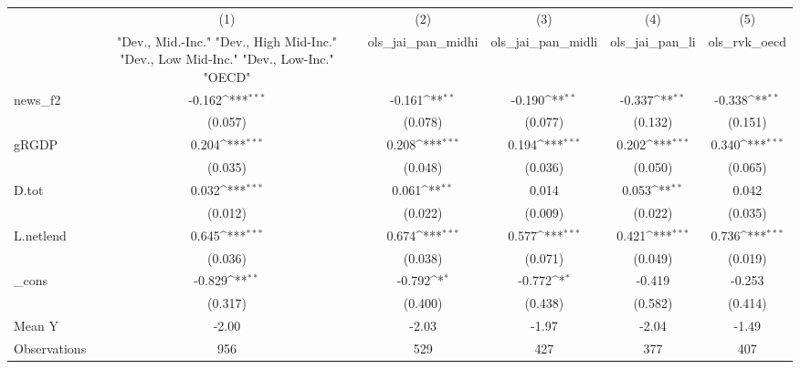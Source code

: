 {
\def\sym#1{\ifmmode^{#1}\else\(^{#1}\)\fi}
\begin{tabular}{l*{5}{c}}
\toprule
            &\multicolumn{1}{c}{(1)}&\multicolumn{1}{c}{(2)}&\multicolumn{1}{c}{(3)}&\multicolumn{1}{c}{(4)}&\multicolumn{1}{c}{(5)}\\
            &\multicolumn{1}{c}{ "Dev., Mid.-Inc." "Dev., High Mid-Inc." "Dev., Low Mid-Inc." "Dev., Low-Inc." "OECD" }&\multicolumn{1}{c}{ols\_jai\_pan\_midhi}&\multicolumn{1}{c}{ols\_jai\_pan\_midli}&\multicolumn{1}{c}{ols\_jai\_pan\_li}&\multicolumn{1}{c}{ols\_rvk\_oecd}\\
\midrule
news\_f2     &      -0.162\sym{***}&      -0.161\sym{**} &      -0.190\sym{**} &      -0.337\sym{**} &      -0.338\sym{**} \\
            &     (0.057)         &     (0.078)         &     (0.077)         &     (0.132)         &     (0.151)         \\
\addlinespace
gRGDP       &       0.204\sym{***}&       0.208\sym{***}&       0.194\sym{***}&       0.202\sym{***}&       0.340\sym{***}\\
            &     (0.035)         &     (0.048)         &     (0.036)         &     (0.050)         &     (0.065)         \\
\addlinespace
D.tot       &       0.032\sym{***}&       0.061\sym{**} &       0.014         &       0.053\sym{**} &       0.042         \\
            &     (0.012)         &     (0.022)         &     (0.009)         &     (0.022)         &     (0.035)         \\
\addlinespace
L.netlend   &       0.645\sym{***}&       0.674\sym{***}&       0.577\sym{***}&       0.421\sym{***}&       0.736\sym{***}\\
            &     (0.036)         &     (0.038)         &     (0.071)         &     (0.049)         &     (0.019)         \\
\addlinespace
\_cons      &      -0.829\sym{**} &      -0.792\sym{*}  &      -0.772\sym{*}  &      -0.419         &      -0.253         \\
            &     (0.317)         &     (0.400)         &     (0.438)         &     (0.582)         &     (0.414)         \\
\midrule
Mean Y      &       -2.00         &       -2.03         &       -1.97         &       -2.04         &       -1.49         \\
Observations&         956         &         529         &         427         &         377         &         407         \\
\bottomrule
\end{tabular}
}
